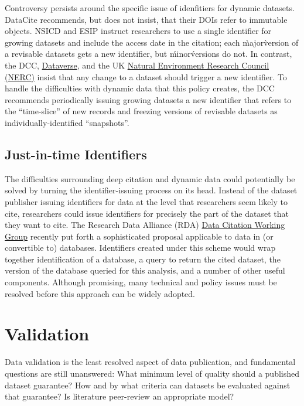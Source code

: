 \documentclass[10pt,twocolumn]{article}
\begin{document}
Controversy persists around the specific issue of idenfitiers for dynamic datasets. 
DataCite recommends, but does not insist, that their DOIs refer to immutable objects.
NSICD and ESIP instruct researchers to use a single identifier for growing datasets and include the access date in the citation; each \`major\` version of a revisable datasets gets a new identifier, but \'minor\' versions do not.
In contrast, the DCC, \href{http://thedata.org/}{Dataverse}, and the UK \href{http://www.nerc.ac.uk/}{Natural Environment Research Council (NERC)} insist that any change to a dataset should trigger a new identifier\cite{ball_how_2011,altman_proposed_2007,callaghan_making_201}.
To handle the difficulties with dynamic data that this policy creates, the DCC recommends periodically issuing growing datasets a new identifier that refers to the ``time-slice'' of new records and freezing versions of revisable datasets as individually-identified ``snapshots''.

\subsection*{Just-in-time Identifiers}\label{just-in-time-identifiers}

The difficulties surrounding deep citation and dynamic data could potentially be solved by turning the identifier-issuing process on its head.
Instead of the dataset publisher issuing identifiers for data at the level that researchers seem likely to cite, researchers could issue identifiers for precisely the part of the dataset that they want to cite.
The Research Data Alliance (RDA) \href{http://rd-alliance.org/working-groups/data-citation-wg.html}{Data Citation Working Group} recently put forth a sophisticated proposal applicable to data in (or convertible to) databases.
Identifiers created under this scheme would wrap together identification of a database, a query to return the cited dataset, the version of the database queried for this analysis, and a number of other useful components.
Although promising, many technical and policy issues must be resolved before this approach can be widely adopted.

\section*{Validation}\label{validation}

Data validation is the least resolved aspect of data publication, and fundamental questions are still unanswered:
What minimum level of quality should a published dataset guarantee?
How and by what criteria can datasets be evaluated against that guarantee?
Is literature peer-review an appropriate model?
\end{document}
